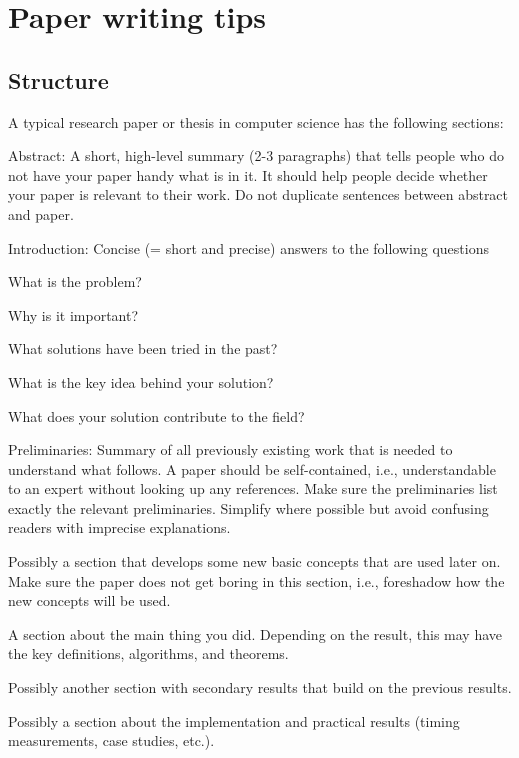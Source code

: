 \documentclass[12pt]{article}
\begin{document}
\section{Paper writing tips}

\subsection{Structure}

A typical research paper or thesis in computer science has the following sections:
\begin{compactitem}
\item Abstract: A short, high-level summary (2-3 paragraphs) that tells people who do not have your paper handy what is in it.
It should help people decide whether your paper is relevant to their work.
Do not duplicate sentences between abstract and paper.
\item Introduction: Concise (= short and precise) answers to the following questions
 \begin{compactitem}
  \item What is the problem?
  \item Why is it important?
  \item What solutions have been tried in the past?
  \item What is the key idea behind your solution?
  \item What does your solution contribute to the field?
 \end{compactitem}
\item Preliminaries: Summary of all previously existing work that is needed to understand what follows.
  A paper should be self-contained, i.e., understandable to an expert without looking up any references.
  Make sure the preliminaries list exactly the relevant preliminaries. Simplify where possible but avoid confusing readers with imprecise explanations.
\item Possibly a section that develops some new basic concepts that are used later on.
Make sure the paper does not get boring in this section, i.e., foreshadow how the new concepts will be used.
\item A section about the main thing you did. Depending on the result, this may have the key definitions, algorithms, and theorems.
\item Possibly another section with secondary results that build on the previous results.
\item Possibly a section about the implementation and practical results (timing measurements, case studies, etc.).

\end{compactitem}
\end{document}
